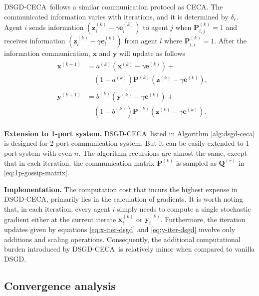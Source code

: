 \documentclass{article}
\newcommand{\ve}{\mathbf{e}}
\newcommand{\bve}{\boldsymbol{e}}
\newcommand{\vx}{\mathbf{x}}
\newcommand{\bvx}{\boldsymbol{x}}
\newcommand{\vy}{\mathbf{y}}
\newcommand{\bvy}{\boldsymbol{y}}
\newcommand{\vz}{\mathbf{z}}
\newcommand{\bvz}{\boldsymbol{z}}
\newcommand{\vP}{\mathbf{P}}
\newcommand{\vQ}{\mathbf{Q}}
\newcommand{\ko}{{(k)}}
\newcommand{\kp}{{(k+1)}}
\newcommand{\ro}{{(r)}}
\newcommand{\Ours}{DSGD-CECA}
\theoremstyle{plain}
\theoremstyle{definition}
\begin{document}
\Ours\ follows a similar communication protocol as CECA. The communicated information varies with iterations, and it is determined by $\delta_r$. Agent $i$ sends information $(\bvz^\ko_i-\gamma\bve^\ko_i)$ to agent $j$ when  $\vP^\ko_{i,j}=1$ and receives information $(\bvz^\ko_l-\gamma\bve^\ko_l)$ from agent $l$ where $\vP^\ko_{l,i}=1$. After the information communication, $\vx$ and $\vy$ will update as follows
\begin{align}
\label{eq:x-iter-dsgd}
&\begin{aligned}
\vx^\kp&=a^\ko(\vx^\ko-\gamma \ve^\ko)+\\
&\quad(1-a^\ko)\vP^\ko(\vz^\ko-\gamma\ve^\ko),
\end{aligned}\\
\label{eq:y-iter-dsgd}
&\begin{aligned}
\vy^\kp&=b^\ko(\vy^\ko-\gamma\ve^\ko)+\\
&\quad(1-b^\ko)\vP^\ko(\vz^\ko-\gamma\ve^\ko).
\end{aligned}
\end{align}

\textbf{Extension to 1-port system.} \Ours\ listed in Algorithm \ref{alg:dsgd-ceca} is designed for 2-port communication system. But it can be easily extended to  1-port system with even $n$. The algorithm recursions are almost the same, except that in each iteration, the communication matrix $\vP^\ko$ is sampled as $\vQ^\ro$ in \eqref{eq:1p-gossip-matrix}. 

\textbf{Implementation.} The computation cost that incurs the highest expense in \Ours, primarily lies in the calculation of gradients. It is worth noting that, in each iteration, every agent $i$ simply needs to compute a single stochastic gradient either at the current iterate $\bvx_i^\ko$ or $\bvy_i^\ko$. Furthermore, the iteration updates given by equations \eqref{eq:x-iter-dsgd} and \eqref{eq:y-iter-dsgd} involve only additions and scaling operations. Consequently, the additional computational burden introduced by \Ours\ is relatively minor when compared to vanilla DSGD.











\subsection{Convergence analysis}
\end{document}
